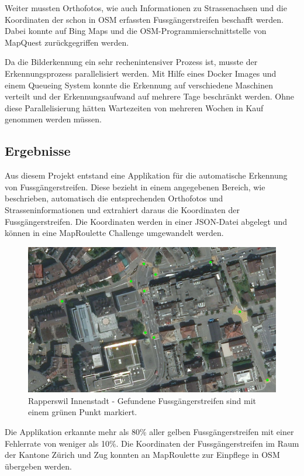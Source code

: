 Weiter mussten Orthofotos, wie auch Informationen zu Strassenachsen und die Koordinaten der schon in OSM erfassten Fussgängerstreifen beschafft werden. Dabei konnte auf Bing Maps und die OSM-Programmierschnittstelle von MapQuest zurückgegriffen werden.

Da die Bilderkennung ein sehr rechenintensiver Prozess ist, musste der Erkennungsprozess parallelisiert werden. Mit Hilfe eines Docker Images und einem Queueing System konnte die Erkennung auf verschiedene Maschinen verteilt und der Erkennungsaufwand auf mehrere Tage beschränkt werden. Ohne diese Parallelisierung hätten Wartezeiten von mehreren Wochen in Kauf genommen werden müssen.


\subsection*{Ergebnisse}
Aus diesem Projekt entstand eine Applikation für die automatische Erkennung von Fussgängerstreifen. Diese bezieht in einem angegebenen Bereich, wie beschrieben, automatisch die entsprechenden Orthofotos und Strasseninformationen und extrahiert daraus die Koordinaten der Fussgängerstreifen. Die Koordinaten werden in einer JSON-Datei abgelegt und können in eine MapRoulette Challenge umgewandelt werden. 
\\
\begin{figure}[H]
	\centering
	\includegraphics[width=\textwidth -10mm]{images/boxsave_rappi.png}
	\caption[Überblick]{Rapperswil Innenstadt - Gefundene Fussgängerstreifen sind mit einem grünen Punkt markiert.}
\end{figure}
\medskip
Die Applikation erkannte mehr als 80\% aller gelben Fussgängerstreifen mit einer Fehlerrate von weniger als 10\%. Die Koordinaten der Fussgängerstreifen im Raum der Kantone Zürich und Zug konnten an MapRoulette zur Einpflege in OSM übergeben werden.
